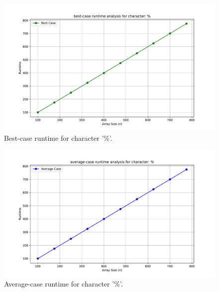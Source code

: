 \documentclass{article}
\begin{document}
        \begin{figure}[H]
		\centering
		\includegraphics[width=\textwidth]{runtime_analysis_best_pcnt.pdf}
		\caption{Best-case runtime for character '\%'.}
	\end{figure}

        \begin{figure}[H]
		\centering
		\includegraphics[width=\textwidth]{runtime_analysis_average_pcnt.pdf}
		\caption{Average-case runtime for character '\%'.}
	\end{figure}
\end{document}
